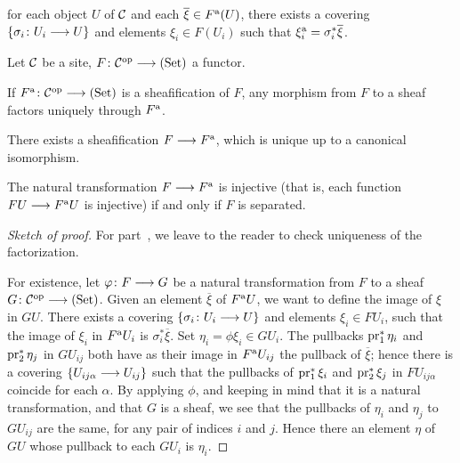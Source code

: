 \begin{2   CONTRAVARIANT FUNCTORS}
\begin{2.3 Sheaves in Grothendieck topologies}
\begin{definition}
\begin{enumeratei}
\item for each object $U$ of $\mathcal{C}$ and each $\overline \xi \in F^\mathrm{a} (U)$, there exists a covering $\{\sigma_i\colon U_i \arr U\}$ and elements $\xi_i \in F(U_i)$ such that $\xi_i^\mathrm{a} = \sigma_i^* \overline{\xi}$.

\end{enumeratei}
\end{definition}



\begin{theorem}
Let $\mathcal{C}$ be a site, $F \colon \cC\op \arr \catset$ a functor.

\begin{enumeratei}

 If $F\ass \colon \cC\op \arr \catset$ is a sheafification of $F$, any morphism from $F$ to a sheaf factors uniquely through $F^\mathrm{a}$.

 There exists a sheafification $F \arr F\ass$, which is unique up to a canonical isomorphism.

 The natural transformation $F \arr F\ass$ is injective (that is, each function $FU \arr F\ass U$ is injective) if and only if $F$ is separated.

\end{enumeratei}
\end{theorem}

\begin{proof}[Sketch of proof]

For part~, we leave to the reader to check uniqueness of the factorization.

For existence, let $\phi \colon F \arr G$ be a natural transformation from $F$ to a sheaf $G \colon  \cC\op \arr \catset$. Given an element $\overline{\xi}$ of $F^\mathrm{a} U$, we want to define the image of $\xi$ in $GU$. There exists a covering $\{\sigma_i \colon U_i \arr U\}$ and elements $\xi_i \in FU_i$, such that the image of $\xi_i$ in $F^\mathrm{a} U_i$ is $\sigma_i^* \overline{\xi}$.  Set $\eta_i= \phi\xi_i \in GU_{i}$. The pullbacks $\operatorname{pr}_1^* \eta_i$ and $\operatorname{pr}_2^* \eta_j$ in $GU_{ij}$ both have as their image in $F^\mathrm{a} U_{ij}$ the pullback of $\overline{\xi}$; hence there is a covering $\{U_{ij \alpha} \arr U _{ij}\}$ such that the pullbacks of $\operatorname{pr}_1^* \xi_i$ and $\operatorname{pr}_2^* \xi_j$ in $F U_{ij\alpha}$ coincide for each $\alpha$. By applying $\phi$, and keeping in mind that it is a natural transformation, and that $G$ is a sheaf, we see that the pullbacks of $\eta_i$ and $\eta_j$ to $G U_{ij}$ are the same, for any pair of indices $i$ and $j$. Hence there an element $\eta$ of $GU$ whose pullback to each $GU_i$ is $\eta_i$. 


\end{proof}
\end{2.3 Sheaves in Grothendieck topologies}
\end{2   CONTRAVARIANT FUNCTORS}
